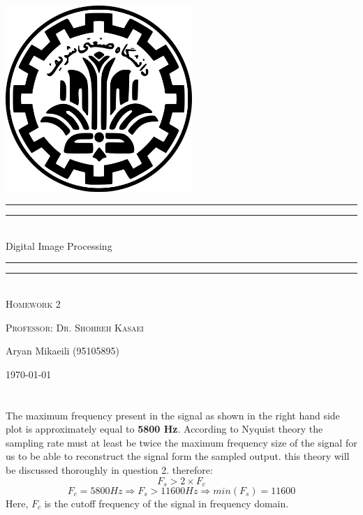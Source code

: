 \documentclass[12pt]{article}
\newlength{\drop}
\begin{document}
  \begin{titlepage}
\textheight
    \centering
	
    \vspace*{\baselineskip}
	\begin{center}
	  \includegraphics[width=200pt]{logo.png}
	\end{center}
    \rule{\textwidth}{1.6pt}\vspace*{-\baselineskip}\vspace*{2pt}
    \rule{\textwidth}{0.4pt}\\[\baselineskip]
    {\LARGE Digital Image Processing }\\[0.2\baselineskip]
    \rule{\textwidth}{0.4pt}\vspace*{-\baselineskip}\vspace{3.2pt}
    \rule{\textwidth}{1.6pt}\\[\baselineskip]
\vspace*{2\baselineskip}
    \scshape
	{\LARGE Homework 2}


    \par
\vspace*{2\baselineskip}
    \scshape
	Professor: Dr. Shohreh Kasaei
    \par

    \vspace*{2\baselineskip}

   {\Large Aryan Mikaeili (95105895)\par}
\vspace*{2\baselineskip}
\today
   	

 
  \end{titlepage}

\vspace*{-\baselineskip}
\section{}
 The maximum frequency present in the signal as shown in the right hand side plot is approximately equal to \textbf{5800 Hz}.
According to Nyquist theory the sampling rate must at least be twice the maximum frequency size of the signal for us to be able to reconstruct the signal form the sampled output. this theory will be discussed thoroughly in question 2. therefore:
$$ F_s > 2 \times F_c$$
$$F_c  = 5800 Hz \Rightarrow F_s > 11600 Hz \Rightarrow min(F_s) = 11600$$
Here, $F_c$ is the cutoff frequency of the signal in frequency domain.
\end{document}
